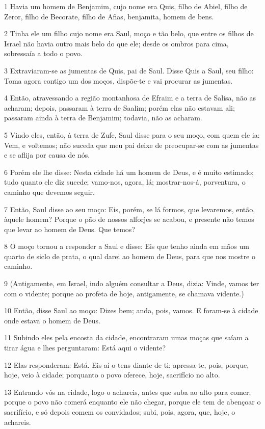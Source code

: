 \par 1 Havia um homem de Benjamim, cujo nome era Quis, filho de Abiel, filho de Zeror, filho de Becorate, filho de Afias, benjamita, homem de bens.
\par 2 Tinha ele um filho cujo nome era Saul, moço e tão belo, que entre os filhos de Israel não havia outro mais belo do que ele; desde os ombros para cima, sobressaía a todo o povo.
\par 3 Extraviaram-se as jumentas de Quis, pai de Saul. Disse Quis a Saul, seu filho: Toma agora contigo um dos moços, dispõe-te e vai procurar as jumentas.
\par 4 Então, atravessando a região montanhosa de Efraim e a terra de Salisa, não as acharam; depois, passaram à terra de Saalim; porém elas não estavam ali; passaram ainda à terra de Benjamim; todavia, não as acharam.
\par 5 Vindo eles, então, à terra de Zufe, Saul disse para o seu moço, com quem ele ia: Vem, e voltemos; não suceda que meu pai deixe de preocupar-se com as jumentas e se aflija por causa de nós.
\par 6 Porém ele lhe disse: Nesta cidade há um homem de Deus, e é muito estimado; tudo quanto ele diz sucede; vamo-nos, agora, lá; mostrar-nos-á, porventura, o caminho que devemos seguir.
\par 7 Então, Saul disse ao seu moço: Eis, porém, se lá formos, que levaremos, então, àquele homem? Porque o pão de nossos alforjes se acabou, e presente não temos que levar ao homem de Deus. Que temos?
\par 8 O moço tornou a responder a Saul e disse: Eis que tenho ainda em mãos um quarto de siclo de prata, o qual darei ao homem de Deus, para que nos mostre o caminho.
\par 9 (Antigamente, em Israel, indo alguém consultar a Deus, dizia: Vinde, vamos ter com o vidente; porque ao profeta de hoje, antigamente, se chamava vidente.)
\par 10 Então, disse Saul ao moço: Dizes bem; anda, pois, vamos. E foram-se à cidade onde estava o homem de Deus.
\par 11 Subindo eles pela encosta da cidade, encontraram umas moças que saíam a tirar água e lhes perguntaram: Está aqui o vidente?
\par 12 Elas responderam: Está. Eis aí o tens diante de ti; apressa-te, pois, porque, hoje, veio à cidade; porquanto o povo oferece, hoje, sacrifício no alto.
\par 13 Entrando vós na cidade, logo o achareis, antes que suba ao alto para comer; porque o povo não comerá enquanto ele não chegar, porque ele tem de abençoar o sacrifício, e só depois comem os convidados; subi, pois, agora, que, hoje, o achareis.
